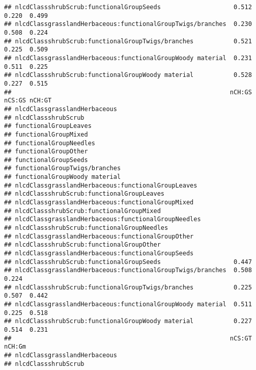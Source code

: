 \documentclass[]{article}
\begin{document}
\begin{verbatim}
## nlcdClassshrubScrub:functionalGroupSeeds                    0.512  0.220  0.499
## nlcdClassgrasslandHerbaceous:functionalGroupTwigs/branches  0.230  0.508  0.224
## nlcdClassshrubScrub:functionalGroupTwigs/branches           0.521  0.225  0.509
## nlcdClassgrasslandHerbaceous:functionalGroupWoody material  0.231  0.511  0.225
## nlcdClassshrubScrub:functionalGroupWoody material           0.528  0.227  0.515
##                                                            nCH:GS nCS:GS nCH:GT
## nlcdClassgrasslandHerbaceous                                                   
## nlcdClassshrubScrub                                                            
## functionalGroupLeaves                                                          
## functionalGroupMixed                                                           
## functionalGroupNeedles                                                         
## functionalGroupOther                                                           
## functionalGroupSeeds                                                           
## functionalGroupTwigs/branches                                                  
## functionalGroupWoody material                                                  
## nlcdClassgrasslandHerbaceous:functionalGroupLeaves                             
## nlcdClassshrubScrub:functionalGroupLeaves                                      
## nlcdClassgrasslandHerbaceous:functionalGroupMixed                              
## nlcdClassshrubScrub:functionalGroupMixed                                       
## nlcdClassgrasslandHerbaceous:functionalGroupNeedles                            
## nlcdClassshrubScrub:functionalGroupNeedles                                     
## nlcdClassgrasslandHerbaceous:functionalGroupOther                              
## nlcdClassshrubScrub:functionalGroupOther                                       
## nlcdClassgrasslandHerbaceous:functionalGroupSeeds                              
## nlcdClassshrubScrub:functionalGroupSeeds                    0.447              
## nlcdClassgrasslandHerbaceous:functionalGroupTwigs/branches  0.508  0.224       
## nlcdClassshrubScrub:functionalGroupTwigs/branches           0.225  0.507  0.442
## nlcdClassgrasslandHerbaceous:functionalGroupWoody material  0.511  0.225  0.518
## nlcdClassshrubScrub:functionalGroupWoody material           0.227  0.514  0.231
##                                                            nCS:GT nCH:Gm
## nlcdClassgrasslandHerbaceous                                            
## nlcdClassshrubScrub                                                     

\end{verbatim}
\end{document}
